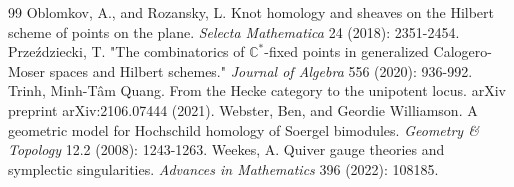 \documentclass{amsart}
\numberwithin{equation}{section}
\theoremstyle{definition}
\newcommand{\C}{{\mathbb C}}
\begin{document}
\begin{thebibliography}{99}
     Oblomkov, A., and Rozansky, L. Knot homology and sheaves on the Hilbert scheme of points on the plane. \textit{Selecta Mathematica} 24 (2018): 2351-2454.
     Przeździecki, T. "The combinatorics of $\C^*$-fixed points in generalized Calogero-Moser spaces and Hilbert schemes." \textit{Journal of Algebra} 556 (2020): 936-992.
     Trinh, Minh-Tâm Quang. From the Hecke category to the unipotent locus. arXiv preprint arXiv:2106.07444 (2021).
     Webster, Ben, and Geordie Williamson. A geometric model for Hochschild homology of Soergel bimodules. \textit{Geometry \& Topology} 12.2 (2008): 1243-1263.
     Weekes, A. Quiver gauge theories and symplectic singularities. \textit{Advances in Mathematics} 396 (2022): 108185.
\end{thebibliography}
\end{document}
